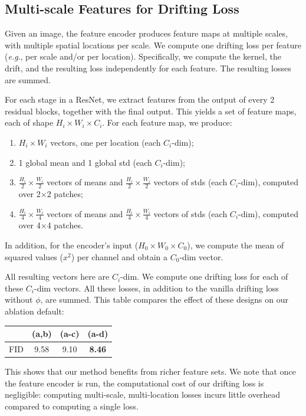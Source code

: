\documentclass{article}
\newcommand{\tablestyle}[2]{\setlength{\tabcolsep}{#1}\renewcommand{\arraystretch}{#2}\centering
\small
}
\newcommand\tablefontsize{%
  \fontsize{8pt}{9pt}\selectfont
}
\def\onedot{.}
\def\eg{\emph{e.g}\onedot} \def\Eg{\emph{E.g}\onedot}
\theoremstyle{plain}
\theoremstyle{definition}
\theoremstyle{remark}
\begin{document}
\subsection{Multi-scale Features for Drifting Loss}
\label{sec:appendix_feature_extraction}

Given an image, the feature encoder produces feature maps at multiple scales, with multiple spatial locations per scale.
We compute one drifting loss per feature (\eg, per scale and/or per location).
Specifically, we compute the kernel, the drift, and the resulting loss independently for each feature. The resulting losses are summed.

For each stage in a ResNet, we extract features from the output of every 2 residual blocks, together with the final output.
This yields a set of feature maps, each of shape $H_i{\times}W_i{\times}C_i$. For each feature map, we produce:
\begin{enumerate}[itemsep=2pt, topsep=2pt, parsep=4pt, partopsep=4pt,label=(\alph*)]
    \item $H_i{\times}W_i$ vectors, one per location (each $C_i$-dim);
    \item 1 global mean and 1 global std (each $C_i$-dim);
    \item $\frac{H_i}{2}{\times}\frac{W_i}{2}$ vectors of means and $\frac{H_i}{2}{\times}\frac{W_i}{2}$ vectors of stds (each $C_i$-dim), computed over 2${\times}$2 patches;
    \item $\frac{H_i}{4}{\times}\frac{W_i}{4}$ vectors of means and $\frac{H_i}{4}{\times}\frac{W_i}{4}$ vectors of stds (each $C_i$-dim), computed over 4${\times}$4 patches.
\end{enumerate}
In addition, for the encoder's input ($H_0{\times}W_0{\times}C_0$), we compute the mean of squared values ($x^2$) per channel and obtain a $C_0$-dim vector.

All resulting vectors here are $C_i$-dim.
We compute one drifting loss for each of these $C_i$-dim vectors. All these losses, in addition to the vanilla drifting loss without $\phi$, are summed.
This table compares the effect of these designs on our ablation default:
\begin{center}
\tablestyle{6pt}{1.02}
\tablefontsize
\begin{tabular}{c|ccc}
\toprule
 & (a,b) & (a-c) & (a-d) \\
\midrule
FID & 9.58 & 9.10 & \textbf{8.46} \\
\bottomrule
\end{tabular}
\end{center}
This shows that our method benefits from richer feature sets.
We note that once the feature encoder is run, the computational cost of our drifting loss is negligible: computing multi-scale, multi-location losses incurs little overhead compared to computing a single loss.
\end{document}
